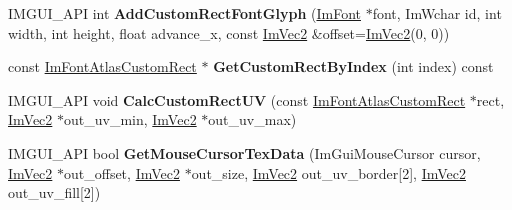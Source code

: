 \begin{DoxyCompactItemize}
\item 
\mbox{\label{structImFontAtlas_a5643182be4e3f1a442cfa6cdc0321c7c}} 
I\+M\+G\+U\+I\+\_\+\+A\+PI int {\bfseries Add\+Custom\+Rect\+Font\+Glyph} (\hyperlink{structImFont}{Im\+Font} $\ast$font, Im\+Wchar id, int width, int height, float advance\+\_\+x, const \hyperlink{structImVec2}{Im\+Vec2} \&offset=\hyperlink{structImVec2}{Im\+Vec2}(0, 0))
\item 
\mbox{\label{structImFontAtlas_a5c71966743c2426472360d939fe1ff79}} 
const \hyperlink{structImFontAtlasCustomRect}{Im\+Font\+Atlas\+Custom\+Rect} $\ast$ {\bfseries Get\+Custom\+Rect\+By\+Index} (int index) const
\item 
\mbox{\label{structImFontAtlas_aee5bbe98379174a8711a761a83b285d8}} 
I\+M\+G\+U\+I\+\_\+\+A\+PI void {\bfseries Calc\+Custom\+Rect\+UV} (const \hyperlink{structImFontAtlasCustomRect}{Im\+Font\+Atlas\+Custom\+Rect} $\ast$rect, \hyperlink{structImVec2}{Im\+Vec2} $\ast$out\+\_\+uv\+\_\+min, \hyperlink{structImVec2}{Im\+Vec2} $\ast$out\+\_\+uv\+\_\+max)
\item 
\mbox{\label{structImFontAtlas_a6d27a36fe034851310dd00d7dc5253c3}} 
I\+M\+G\+U\+I\+\_\+\+A\+PI bool {\bfseries Get\+Mouse\+Cursor\+Tex\+Data} (Im\+Gui\+Mouse\+Cursor cursor, \hyperlink{structImVec2}{Im\+Vec2} $\ast$out\+\_\+offset, \hyperlink{structImVec2}{Im\+Vec2} $\ast$out\+\_\+size, \hyperlink{structImVec2}{Im\+Vec2} out\+\_\+uv\+\_\+border\mbox{[}2\mbox{]}, \hyperlink{structImVec2}{Im\+Vec2} out\+\_\+uv\+\_\+fill\mbox{[}2\mbox{]})
\end{DoxyCompactItemize}
